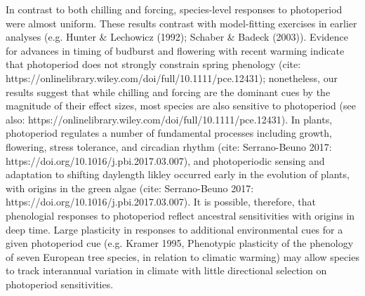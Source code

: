 \documentclass{article}\usepackage[]{graphicx}\usepackage[]{color}
\begin{document}
In contrast to both chilling and forcing, species-level responses to photoperiod were almost uniform. These results contrast with model-fitting exercises in earlier analyses (e.g. Hunter \& Lechowicz (1992); Schaber \& Badeck (2003)). Evidence for advances in timing of budburst and flowering with recent warming indicate that photoperiod does not strongly constrain spring phenology (cite: https://onlinelibrary.wiley.com/doi/full/10.1111/pce.12431); nonetheless, our results suggest that while chilling and forcing are the dominant cues by the magnitude of their effect sizes, most species are also sensitive to photoperiod (see also: https://onlinelibrary.wiley.com/doi/full/10.1111/pce.12431). In plants, photoperiod regulates a number of fundamental processes including growth, flowering, stress tolerance, and circadian rhythm (cite: Serrano-Beuno 2017:  https://doi.org/10.1016/j.pbi.2017.03.007), and photoperiodic sensing and adaptation to shifting daylength likley occurred early in the evolution of plants, with origins in the green algae (cite: Serrano-Beuno 2017:  https://doi.org/10.1016/j.pbi.2017.03.007). It is possible, therefore, that phenologial responses to photoperiod reflect ancestral sensitivities with origins in deep time. Large plasticity in responses to additional environmental cues for a given photoperiod cue (e.g. Kramer 1995, Phenotypic plasticity of the phenology of seven European tree species, in relation to climatic warming) may allow species to track interannual variation in climate with little directional selection on photoperiod sensitivities.\\
\end{document}
